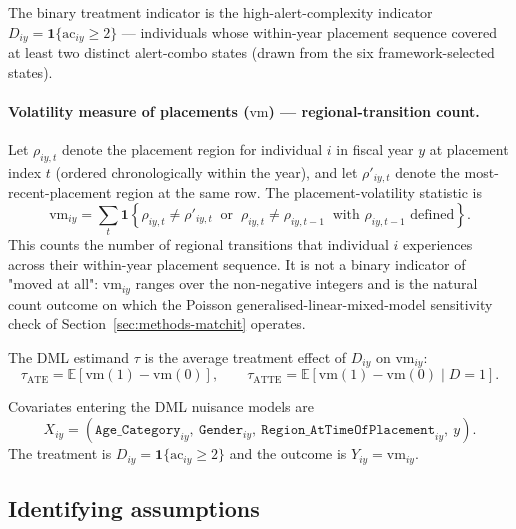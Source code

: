 \documentclass[article,shortnames,nojss]{jss}
\renewcommand{\E}{\mathbb{E}}
\newcommand{\ac}{\ensuremath{\mathrm{ac}}}
\newcommand{\vm}{\ensuremath{\mathrm{vm}}}
\begin{document}
The binary treatment indicator is the high-alert-complexity indicator
$D_{iy} = \mathbf{1}\{\ac_{iy} \ge 2\}$ --- individuals whose
within-year placement sequence covered at least two distinct alert-combo
states (drawn from the six framework-selected states).

\paragraph{Volatility measure of placements ($\vm$) --- regional-transition count.}
Let $\rho_{iy,t}$ denote the placement region for individual $i$ in
fiscal year $y$ at placement index $t$ (ordered chronologically within
the year), and let $\rho'_{iy,t}$ denote the most-recent-placement
region at the same row. The placement-volatility statistic is
\begin{equation}
\label{eq:vm}
  \vm_{iy} = \sum_{t}
    \mathbf{1}\!\left\{
      \rho_{iy,t} \neq \rho'_{iy,t}
      \;\;\text{or}\;\;
      \rho_{iy,t} \neq \rho_{iy,t-1}
      \;\;\text{with $\rho_{iy,t-1}$ defined}
    \right\}.
\end{equation}
This counts the number of regional transitions that individual $i$
experiences across their within-year placement sequence. It is not a
binary indicator of "moved at all": $\vm_{iy}$ ranges over the
non-negative integers and is the natural count outcome on which the
Poisson generalised-linear-mixed-model sensitivity check of
Section~\ref{sec:methods-matchit} operates.

The DML estimand $\tau$ is the average treatment effect of $D_{iy}$
on $\vm_{iy}$:
\begin{equation}
  \tau_{\mathrm{ATE}} = \E[\vm(1) - \vm(0)], \qquad
  \tau_{\mathrm{ATTE}} = \E[\vm(1) - \vm(0) \mid D = 1].
\end{equation}

Covariates entering the DML nuisance models are
\[
X_{iy} = (\texttt{Age\_Category}_{iy},\ \texttt{Gender}_{iy},\ \texttt{Region\_AtTimeOfPlacement}_{iy},\ y).
\]
The treatment is $D_{iy} = \mathbf{1}\{\ac_{iy} \ge 2\}$ and the outcome is $Y_{iy} = \vm_{iy}$.

\subsection{Identifying assumptions}
\label{sec:methods-id}
\end{document}
